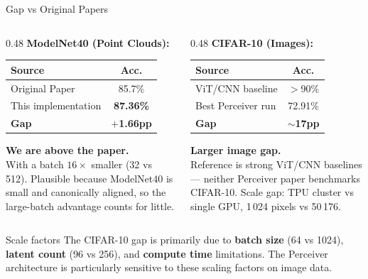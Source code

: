 \documentclass[aspectratio=169,11pt]{beamer}
\begin{document}
\begin{frame}[shrink=10]{Gap vs Original Papers}
  \begin{columns}[T]
    \begin{column}{0.48\textwidth}
      \textbf{ModelNet40 (Point Clouds):}
      \begin{table}
        \centering\small
        \begin{tabular}{lc}
          \toprule
          \textbf{Source} & \textbf{Acc.} \\
          \midrule
          Original Paper & 85.7\% \\
          This implementation & \textbf{87.36\%} \\
          \midrule
          \textbf{Gap} & \textcolor{AccentGreen}{\textbf{$+$1.66pp}} \\
          \bottomrule
        \end{tabular}
      \end{table}

      \vspace{0.3em}
      \textbf{We are above the paper.}\\
      With a batch $16\times$ smaller (32 vs 512). Plausible because ModelNet40 is small and canonically aligned, so the large-batch advantage counts for little.
    \end{column}
    \begin{column}{0.48\textwidth}
      \textbf{CIFAR-10 (Images):}
      \begin{table}
        \centering\small
        \begin{tabular}{lc}
          \toprule
          \textbf{Source} & \textbf{Acc.} \\
          \midrule
          ViT/CNN baseline & $>$90\% \\
          Best Perceiver run & 72.91\% \\
          \midrule
          \textbf{Gap} & \textcolor{AccentRed}{\textbf{$\sim$17pp}} \\
          \bottomrule
        \end{tabular}
      \end{table}

      \vspace{0.3em}
      \textbf{Larger image gap.}\\
      Reference is strong ViT/CNN baselines --- neither Perceiver paper benchmarks CIFAR-10. Scale gap: TPU cluster vs single GPU, 1\,024 pixels vs 50\,176.
    \end{column}
  \end{columns}

  \vspace{0.5em}
  \begin{block}{Scale factors}
    The CIFAR-10 gap is primarily due to \textbf{batch size} (64 vs 1024), \textbf{latent count} (96 vs 256), and \textbf{compute time} limitations. The Perceiver architecture is particularly sensitive to these scaling factors on image data.
  \end{block}
\end{frame}
\end{document}
